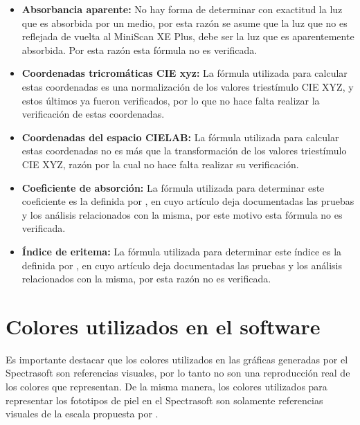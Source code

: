 	\begin{itemize}
		
		\item \textbf{Absorbancia aparente:} No hay forma de determinar con exactitud la luz que es absorbida por un medio, por esta raz\'{o}n se asume que la luz que no es reflejada de vuelta al MiniScan XE Plus, debe ser la luz que es aparentemente absorbida. Por esta raz\'{o}n esta f\'{o}rmula no es verificada.
	
		\item \textbf{Coordenadas tricrom\'{a}ticas CIE xyz:} La f\'{o}rmula utilizada para calcular estas coordenadas es una normalizaci\'{o}n de los valores triest\'{i}mulo CIE XYZ, y estos \'{u}ltimos ya fueron verificados, por lo que no hace falta realizar la verificaci\'{o}n de estas coordenadas.
		
		\item \textbf{Coordenadas del espacio CIELAB:} La f\'{o}rmula utilizada para calcular estas coordenadas no es m\'{a}s que la transformaci\'{o}n de los valores triest\'{i}mulo CIE XYZ, raz\'{o}n por la cual no hace falta realizar su verificaci\'{o}n.
		
		\item \textbf{Coeficiente de absorci\'{o}n:} La f\'{o}rmula utilizada para determinar este coeficiente es la definida por , en cuyo art\'{i}culo deja documentadas las pruebas y los an\'{a}lisis relacionados con la misma, por este motivo esta f\'{o}rmula no es verificada.
		
		\item \textbf{\'{I}ndice de eritema:} La f\'{o}rmula utilizada para determinar este \'{i}ndice es la definida por , en cuyo art\'{i}culo deja documentadas las pruebas y los an\'{a}lisis relacionados con la misma, por esta raz\'{o}n no es verificada.
	\end{itemize}
	
\section{Colores utilizados en el software}

	Es importante destacar que los colores utilizados en las gr\'{a}ficas generadas por el Spectrasoft son referencias visuales, por lo tanto no son una reproducci\'{o}n real de los colores que representan. De la misma manera, los colores utilizados para representar los fototipos de piel en el Spectrasoft son solamente referencias visuales de la escala propuesta por .